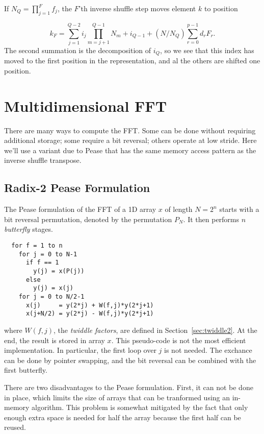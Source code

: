 \documentclass{article}
\begin{document}
If $N_Q = \prod_{j=1}^F f_j$, the $F$'th inverse shuffle step moves
element $k$ to position

\begin{equation}\label{eqn:multidim}
  k_F = \sum_{j=1}^{Q-2} i_j \prod_{m=j+1}^{Q-1}N_m + i_{Q-1} +
        (N/N_Q) \sum_{r=0}^{p-1} d_r F_r .
\end{equation}
%
The second summation is the decomposition of $i_Q$, so we see that
this index has moved to the first position in the representation, and
al the others are shifted one position.

\section{Multidimensional FFT}
\label{sec:fft}

There are many ways to compute the FFT.  Some can be done without
requiring additional storage; some require a bit reversal; others
operate at low stride.  Here we'll use a variant due to Pease that
has the same memory access pattern as the inverse shuffle transpose.

\subsection{Radix-2 Pease Formulation} \label{sec:pease2}

The Pease formulation of the FFT of a 1D array $x$ of length $N = 2^n$
starts with a bit reversal permutation, denoted by the permutation
$P_N$.  It then performs $n$ {\em butterfly} stages.

\begin{verbatim}
  for f = 1 to n
    for j = 0 to N-1
      if f == 1
        y(j) = x(P(j))
      else
        y(j) = x(j)
    for j = 0 to N/2-1
      x(j)     = y(2*j) + W(f,j)*y(2*j+1)
      x(j+N/2) = y(2*j) - W(f,j)*y(2*j+1)
\end{verbatim}
%
where $W(f,j)$, the {\em twiddle factors}, are defined in
Section~\ref{sec:twiddle2}.  At the end, the result is stored in array
$x$.  This pseudo-code is not the most efficient implementation.  In
particular, the first loop over $j$ is not needed.  The exchance can
be done by pointer swapping, and the bit reversal can be combined with
the first butterfly.

There are two disadvantages to the Pease formulation.  First, it can
not be done in place, which limits the size of arrays that can be
tranformed using an in-memory algorithm.  This problem is somewhat
mitigated by the fact that only enough extra space is needed for half
the array because the first half can be reused.
\end{document}
